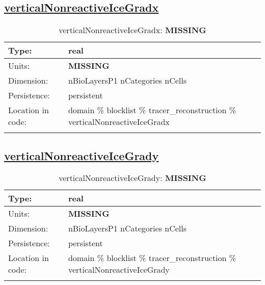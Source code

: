 \subsection[verticalNonreactiveIceGradx]{\hyperref[sec:var_tab_tracer_reconstruction]{verticalNonreactiveIceGradx}}
\label{subsec:var_sec_tracer_reconstruction_verticalNonreactiveIceGradx}
\begin{center}
\begin{longtable}{| p{2.0in} | p{4.0in} |}
        \hline 
        Type: & real \\
        \hline 
        Units: & {\bf \color{red} MISSING} \\
        \hline 
        Dimension: & nBioLayersP1 nCategories nCells \\
        \hline 
        Persistence: & persistent \\
        \hline 
         Location in code: & domain \% blocklist \% tracer\_reconstruction \% verticalNonreactiveIceGradx \\
         \hline 
    \caption{verticalNonreactiveIceGradx: {\bf \color{red} MISSING}}
\end{longtable}
\end{center}
\subsection[verticalNonreactiveIceGrady]{\hyperref[sec:var_tab_tracer_reconstruction]{verticalNonreactiveIceGrady}}
\label{subsec:var_sec_tracer_reconstruction_verticalNonreactiveIceGrady}
\begin{center}
\begin{longtable}{| p{2.0in} | p{4.0in} |}
        \hline 
        Type: & real \\
        \hline 
        Units: & {\bf \color{red} MISSING} \\
        \hline 
        Dimension: & nBioLayersP1 nCategories nCells \\
        \hline 
        Persistence: & persistent \\
        \hline 
         Location in code: & domain \% blocklist \% tracer\_reconstruction \% verticalNonreactiveIceGrady \\
         \hline 
    \caption{verticalNonreactiveIceGrady: {\bf \color{red} MISSING}}
\end{longtable}
\end{center}
